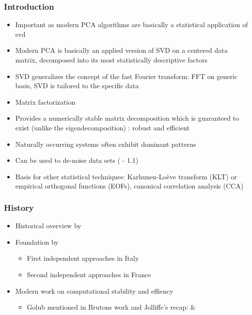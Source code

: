 \subsubsection{Introduction}

\begin{itemize}
	\item Important as modern PCA algorithms are basically a statistical application of \gls{svd}
	\item Modern PCA is basically an applied version of SVD on a centered data matrix, decomposed into its most statistically descriptive factors
	\item SVD generalizes the concept of the fast Fourier transform: FFT on generic basis, SVD is tailored to the specific data
	\item Matrix factorization
	\item Provides a numerically stable matrix decomposition which is guaranteed to exist (unlike the eigendecomposition) \cite{brunton2019data}: robust and efficient
	\item Naturally occurring systems often exhibit dominant patterns
	\item Can be used to de-noise data sets (\cite{brunton2019data} - 1.1)
	\item Basis for other statistical techniques: Karhunen-Loève transform (KLT) or empirical orthogonal functions (EOFs), canonical correlation analysis (CCA)
\end{itemize}

\clearpage



\subsubsection{History}

\begin{itemize}
	\item Historical overview by \cite{stewart1993early}
	\item Foundation by
	\begin{itemize}
		\item First independent approaches in Italy \cite{beltrami1873sulle}
		\item Second independent approaches in France \cite{Jordan1874}	
	\end{itemize}
	\item Modern work on computational stability and effiency \cite{brunton2019data}
	\begin{itemize}
		\item Golub mentioned in Brutons work and Jolliffe's recap: \cite{golub1965calculating} \& \cite{golub1971singular}
	\end{itemize}
\end{itemize}

